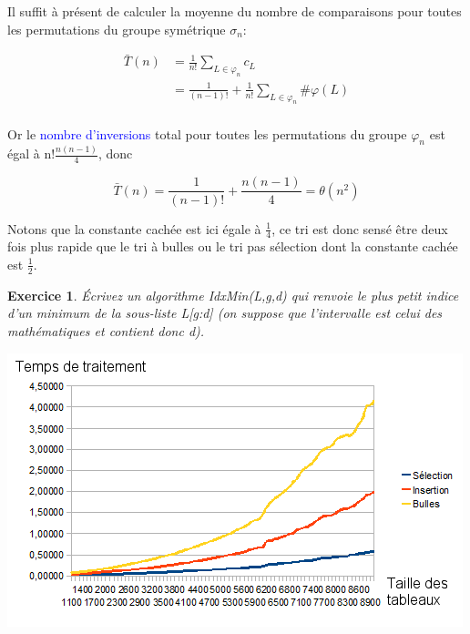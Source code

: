 \documentclass[a4paper,10pt]{article}
\newtheorem{exo}{Exercice}
\begin{document}
Il suffit à présent de calculer la moyenne du nombre de comparaisons pour toutes les permutations du groupe 
symétrique $\sigma_n$:

\begin{align*}
    \bar{T}(n) & = \frac{1}{n!} \sum_{L \in \varphi_n}c_L \\
               & = \frac{1}{(n-1)!} + \frac{1}{n!} \sum_{L \in \varphi_n}\#\varphi(L) \\
\end{align*}

Or le \textcolor{blue}{nombre d'inversions} total pour toutes les permutations du groupe $\varphi_n$ est égal 
à n!$\frac{n(n-1)}{4}$, donc

\begin{equation}
    \bar{T}(n)  = \frac{1}{(n-1)!} + \frac{n(n-1)}{4} = \theta(n^2) 
\end{equation}

Notons que la constante cachée est ici égale à $\frac{1}{4}$, ce tri est donc sensé être deux fois plus rapide que 
le tri à bulles ou le tri pas sélection dont la constante cachée est $\frac{1}{2}$.

\begin{exo}
    Écrivez un algorithme IdxMin(L,g,d) qui renvoie le plus petit indice d'un minimum de la sous-liste L[g:d]
    (on suppose que l'intervalle est celui des mathématiques et contient donc d).
\end{exo}


\includegraphics[scale=0.5]{tris_empiriques_grph.png}

\printbibliography
\end{document}
